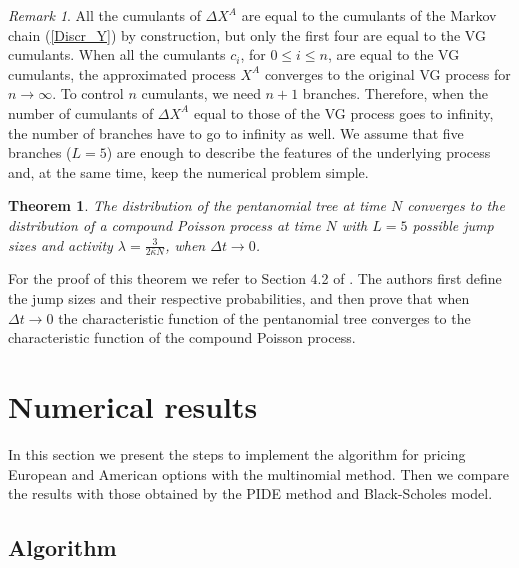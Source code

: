 \documentclass[]{interact}
\theoremstyle{plain}%
\newtheorem{theorem}{Theorem}[section]
\theoremstyle{definition}
\theoremstyle{remark}
\newtheorem{remark}{Remark}
\begin{document}
\begin{remark}
All the cumulants of $\Delta X^A$ are equal to the cumulants of the Markov chain (\ref{Discr_Y}) by construction, but only the first four are equal to the VG cumulants.
When all the cumulants $c_i$, for $0 \leq i \leq n$, are equal to the VG cumulants, the approximated process $X^A$ converges to
the original VG process for $n \to \infty$.
To control $n$ cumulants, we need $n+1$ branches. Therefore, when the number of cumulants of $\Delta X^A$ equal to those of the VG process goes to infinity, 
the number of branches have to go to infinity as well.
We assume that five branches ($L=5$) are enough to describe the features of the underlying process and, at the same time, keep the numerical
problem simple. 
\end{remark}

\begin{theorem}
The distribution of the pentanomial tree at time $N$ converges to the distribution of a compound Poisson process at time $N$ with $L=5$ possible jump sizes and activity $\lambda = \frac{3}{2 \bar \kappa N}$, when $\Delta t \to 0$.   
\end{theorem}
For the proof of this theorem  
we refer to Section 4.2 of \cite{YaPr06}. The authors first define the jump sizes and their respective probabilities, and then
prove that when $\Delta t \to 0$ the characteristic function of the pentanomial tree converges to the 
characteristic function of the compound Poisson process.



\section{Numerical results} \label{sec4}

In this section we present the steps to implement the algorithm for pricing European and American options with the multinomial method.
Then we compare the results with those obtained by the PIDE method and Black-Scholes model.

\subsection{Algorithm}
\end{document}
